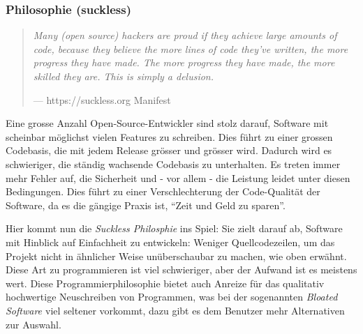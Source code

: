 \documentclass[a4paper,11pt]{article}
\newenvironment{nicequote}[2]{
    \begin{center}\begin{quote}\textit{#1}\\\par\raggedleft--- {#2}
    }{
    \end{quote}\end{center}
}
\begin{document}
\subsubsection{Philosophie (suckless)}

\begin{nicequote}{Many (open source) hackers are proud if they achieve large amounts of code, because they believe the more lines of code they've written, the more progress they have made. The more progress they have made, the more skilled they are. This is simply a delusion.}{https://suckless.org Manifest \cite{suckless}}
\end{nicequote}


Eine grosse Anzahl Open-Source-Entwickler sind stolz darauf, Software mit scheinbar möglichst vielen Features zu schreiben. Dies führt zu einer grossen Codebasis, die mit jedem Release grösser und grösser wird. Dadurch wird es schwieriger, die ständig wachsende Codebasis zu unterhalten. Es treten immer mehr Fehler auf, die Sicherheit und - vor allem - die Leistung leidet unter diesen Bedingungen. Dies führt zu einer Verschlechterung der Code-Qualität der Software, da es die gängige Praxis ist, ``Zeit und Geld zu sparen''. \cite{bhattacharya2020}\



Hier kommt nun die \textit{Suckless Philosphie} ins Spiel: Sie zielt darauf ab, Software mit Hinblick auf Einfachheit zu entwickeln: Weniger Quellcodezeilen, um das Projekt nicht in ähnlicher Weise unüberschaubar zu machen, wie oben erwähnt. Diese Art zu programmieren ist viel schwieriger, aber der Aufwand ist es meistens wert. Diese Programmierphilosophie bietet auch Anreize für das qualitativ hochwertige Neuschreiben von Programmen, was bei der sogenannten \textit{Bloated Software \cite{bhattacharya2020}} viel seltener vorkommt, dazu gibt es dem Benutzer mehr Alternativen zur Auswahl.
\end{document}
